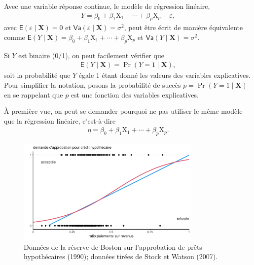 \documentclass[
  11pt,
  letterpaper,
]{scrbook}
\theoremstyle{definition}
\theoremstyle{remark}
\begin{document}
Avec une variable réponse continue, le modèle de régression linéaire,
\begin{align*}
 Y = \beta_0 + \beta_1\mathrm{X}_1 + \cdots + \beta_p \mathrm{X}_p + \varepsilon,
\end{align*} avec \(\mathsf{E}(\varepsilon \mid \mathbf{X})=0\) et
\(\mathsf{Va}(\varepsilon \mid \mathbf{X})=\sigma^2\), peut être écrit
de manière équivalente comme
\(\mathsf{E}(Y \mid \mathbf{X}) = \beta_0 + \beta_1\mathrm{X}_1 + \cdots + \beta_p\mathrm{X}_p\)
et \(\mathsf{Va}(Y \mid \mathbf{X})=\sigma^2.\)

Si \(Y\) est binaire (0/1), on peut facilement vérifier que
\begin{align*}
\mathsf{E}(Y \mid \mathbf{X}) = \Pr(Y=1 \mid  \mathbf{X}),
\end{align*} soit la probabilité que \(Y\) égale 1 étant donné les
valeurs des variables explicatives. Pour simplifier la notation, posons
la probabilité de succès \(p = \Pr(Y=1 \mid \mathbf{X})\) en se
rappelant que \(p\) est une fonction des variables explicatives.

À première vue, on peut se demander pourquoi ne pas utiliser le même
modèle que la régression linéaire, c'est-à-dire \begin{align*}
\eta=\beta_0 + \beta_1\mathrm{X}_1 + \cdots + \beta_p \mathrm{X}_p.
\end{align*}

\begin{figure}[ht!]

{\centering \includegraphics[width=0.8\textwidth,height=\textheight]{reglogistique_files/figure-pdf/fig-demandecredit-1.pdf}

}

\caption{\label{fig-demandecredit}Données de la réserve de Boston sur
l'approbation de prêts hypothécaires (1990); données tirées de Stock et
Watson (2007).}

\end{figure}
\end{document}

